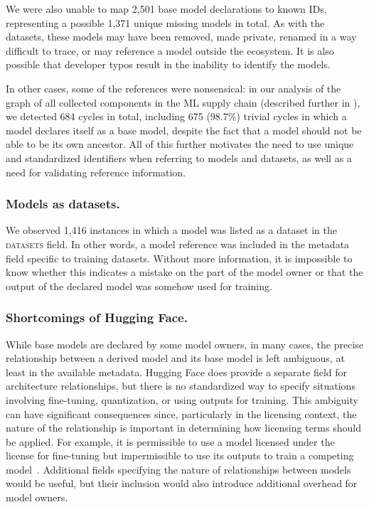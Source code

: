 We were also unable to map 2,501 base model declarations to known IDs, representing a possible 1,371 unique missing models in total. %
As with the datasets, these models may have been removed, made private, renamed in a way difficult to trace, or may reference a model outside the ecosystem.  It is also possible that developer typos result in the inability to identify the models. 

In other cases, some of the references were nonsensical: in our analysis of the graph of all collected components in the ML supply chain (described further in ), we detected 684 cycles in total, including 675 (98.7\%) trivial cycles in which a model declares itself as a base model, despite the fact that a model should not be able to be its own ancestor. All of this further motivates the need to use unique and standardized identifiers when referring to models and datasets, as well as a need for validating reference information.

\subsubsection{Models as datasets.} \label{sec:models_as_data} We observed 1,416 instances in which a model was listed as a dataset in the \textsc{datasets} field. In other words, a model reference was included in the metadata field specific to training datasets.  Without more information, it is impossible to know whether this indicates a mistake on the part of the model owner or that the output of the declared model was somehow used for training. 

\subsubsection{Shortcomings of Hugging Face.} 
\label{sec:no_relationship}
While base models are declared by some model owners, in many cases, the precise relationship between a derived model and its base model is left ambiguous, at least in the available metadata. Hugging Face does provide a separate field for architecture relationships, but there is no standardized way to specify situations involving fine-tuning, quantization, or using outputs for training.  This ambiguity can have significant consequences since, particularly in the licensing context, the nature of the relationship is important in determining how licensing terms should be applied. For example, it is permissible to use a model licensed under the  license for fine-tuning but impermissible to use its outputs to train a competing model~\cite{llama3_license}.  Additional fields specifying the nature of relationships between models would be useful, but their inclusion would also introduce additional overhead for model owners.


